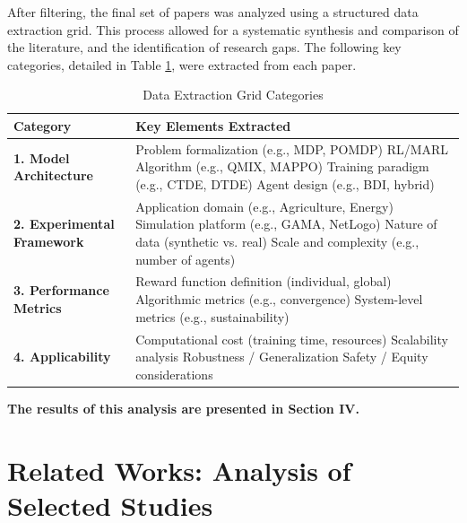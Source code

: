 \documentclass[conference]{IEEEtran}
\begin{document}
After filtering, the final set of papers was analyzed using a structured data extraction grid. This process allowed for a systematic synthesis and comparison of the literature, and the identification of research gaps. The following key categories, detailed in Table \ref{tab:grid}, were extracted from each paper.

\begin{table}[htbp]
\caption{Data Extraction Grid Categories}
\begin{center}
\begin{tabularx}{\columnwidth}{|l|X|}
\hline
\textbf{Category} & \textbf{Key Elements Extracted} \\
\hline
\textbf{1. Model Architecture} & 
Problem formalization (e.g., MDP, POMDP) \newline
RL/MARL Algorithm (e.g., QMIX, MAPPO) \newline
Training paradigm (e.g., CTDE, DTDE) \newline
Agent design (e.g., BDI, hybrid)
\\
\hline
\textbf{2. Experimental Framework} & 
Application domain (e.g., Agriculture, Energy) \newline
Simulation platform (e.g., GAMA, NetLogo) \newline
Nature of data (synthetic vs. real) \newline
Scale and complexity (e.g., number of agents)
\\
\hline
\textbf{3. Performance Metrics} & 
Reward function definition (individual, global) \newline
Algorithmic metrics (e.g., convergence) \newline
System-level metrics (e.g., sustainability)
\\
\hline
\textbf{4. Applicability} & 
Computational cost (training time, resources) \newline
Scalability analysis \newline
Robustness / Generalization \newline
Safety / Equity considerations
\\
\hline
\end{tabularx}
\label{tab:grid}
\end{center}
\end{table}

\textbf{The results of this analysis are presented in Section IV.}

\section{Related Works: Analysis of Selected Studies}
\end{document}
